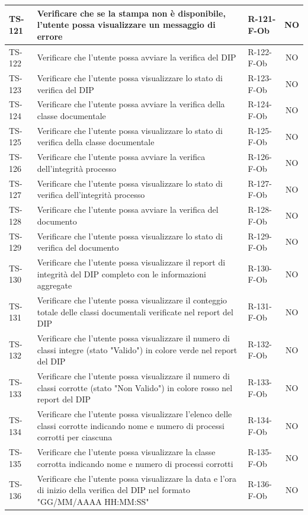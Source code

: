 \documentclass[a4paper,12pt]{article}
\begin{document}
\begin{longtable}{|p{1.5cm}|p{8.3cm}|p{2.4cm}|c|}
\hline
TS-121 & Verificare che se la stampa non è disponibile, l'utente possa visualizzare un messaggio di errore & R-121-F-Ob & NO \\
\hline
TS-122 & Verificare che l'utente possa avviare la verifica del DIP & R-122-F-Ob & NO \\
\hline
TS-123 & Verificare che l'utente possa visualizzare lo stato di verifica del DIP & R-123-F-Ob & NO \\
\hline
TS-124 & Verificare che l'utente possa avviare la verifica della classe documentale & R-124-F-Ob & NO \\
\hline
TS-125 & Verificare che l'utente possa visualizzare lo stato di verifica della classe documentale & R-125-F-Ob & NO \\
\hline
TS-126 & Verificare che l'utente possa avviare la verifica dell'integrità processo & R-126-F-Ob & NO \\
\hline
TS-127 & Verificare che l'utente possa visualizzare lo stato di verifica dell'integrità processo & R-127-F-Ob & NO \\
\hline
TS-128 & Verificare che l'utente possa avviare la verifica del documento & R-128-F-Ob & NO \\
\hline
TS-129 & Verificare che l'utente possa visualizzare lo stato di verifica del documento & R-129-F-Ob & NO \\
\hline
TS-130 & Verificare che l'utente possa visualizzare il report di integrità del DIP completo con le informazioni aggregate & R-130-F-Ob & NO \\
\hline
TS-131 & Verificare che l'utente possa visualizzare il conteggio totale delle classi documentali verificate nel report del DIP & R-131-F-Ob & NO \\
\hline
TS-132 & Verificare che l'utente possa visualizzare il numero di classi integre (stato "Valido") in colore verde nel report del DIP & R-132-F-Ob & NO \\
\hline
TS-133 & Verificare che l'utente possa visualizzare il numero di classi corrotte (stato "Non Valido") in colore rosso nel report del DIP & R-133-F-Ob & NO \\
\hline
TS-134 & Verificare che l'utente possa visualizzare l'elenco delle classi corrotte indicando nome e numero di processi corrotti per ciascuna & R-134-F-Ob & NO \\
\hline
TS-135 & Verificare che l'utente possa visualizzare la classe corrotta indicando nome e numero di processi corrotti & R-135-F-Ob & NO \\
\hline
TS-136 & Verificare che l'utente possa visualizzare la data e l'ora di inizio della verifica del DIP nel formato "GG/MM/AAAA HH:MM:SS" & R-136-F-Ob & NO \\

\end{longtable}
\end{document}
